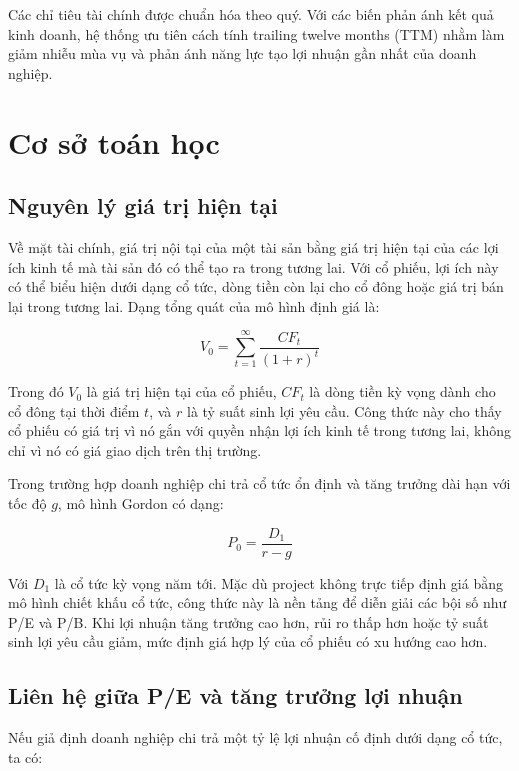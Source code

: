 \documentclass[12pt,a4paper]{article}
\begin{document}
Các chỉ tiêu tài chính được chuẩn hóa theo quý. Với các biến phản ánh kết quả kinh doanh, hệ thống ưu tiên cách tính trailing twelve months (TTM) nhằm làm giảm nhiễu mùa vụ và phản ánh năng lực tạo lợi nhuận gần nhất của doanh nghiệp.

\section{Cơ sở toán học}

\subsection{Nguyên lý giá trị hiện tại}

Về mặt tài chính, giá trị nội tại của một tài sản bằng giá trị hiện tại của các lợi ích kinh tế mà tài sản đó có thể tạo ra trong tương lai. Với cổ phiếu, lợi ích này có thể biểu hiện dưới dạng cổ tức, dòng tiền còn lại cho cổ đông hoặc giá trị bán lại trong tương lai. Dạng tổng quát của mô hình định giá là:

\begin{equation}
    V_0 = \sum_{t=1}^{\infty} \frac{CF_t}{(1+r)^t}
\end{equation}

Trong đó $V_0$ là giá trị hiện tại của cổ phiếu, $CF_t$ là dòng tiền kỳ vọng dành cho cổ đông tại thời điểm $t$, và $r$ là tỷ suất sinh lợi yêu cầu. Công thức này cho thấy cổ phiếu có giá trị vì nó gắn với quyền nhận lợi ích kinh tế trong tương lai, không chỉ vì nó có giá giao dịch trên thị trường.

Trong trường hợp doanh nghiệp chi trả cổ tức ổn định và tăng trưởng dài hạn với tốc độ $g$, mô hình Gordon có dạng:

\begin{equation}
    P_0 = \frac{D_1}{r-g}
\end{equation}

Với $D_1$ là cổ tức kỳ vọng năm tới. Mặc dù project không trực tiếp định giá bằng mô hình chiết khấu cổ tức, công thức này là nền tảng để diễn giải các bội số như P/E và P/B. Khi lợi nhuận tăng trưởng cao hơn, rủi ro thấp hơn hoặc tỷ suất sinh lợi yêu cầu giảm, mức định giá hợp lý của cổ phiếu có xu hướng cao hơn.

\subsection{Liên hệ giữa P/E và tăng trưởng lợi nhuận}

Nếu giả định doanh nghiệp chi trả một tỷ lệ lợi nhuận cố định dưới dạng cổ tức, ta có:
\end{document}
